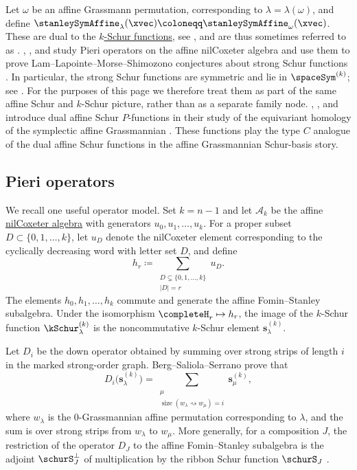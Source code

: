Let $\omega$ be an affine Grassmann permutation, corresponding to
$\lambda = \lambda(\omega)$, and define
$\stanleySymAffine_\lambda(\xvec) \coloneqq \stanleySymAffine_\omega(\xvec)$.
These are dual to the \hyperref[kSchur]{$k$-Schur functions}, see \cite{MorseSchilling2015,LapointeMorse2008},
and are thus sometimes referred to as
\label{dualKSchurFunction}.
, , and  study
Pieri operators on the affine nilCoxeter algebra and use them to prove
Lam--Lapointe--Morse--Shimozono conjectures about strong Schur functions
\cite{BergSaliolaSerrano2013}.  In particular, the strong Schur functions
are symmetric and lie in $\spaceSym^{(k)}$; see
\cite[Thms.~5.2 and 5.4]{BergSaliolaSerrano2013}.  For the purposes of this
page we therefore treat them as part of the same affine Schur and
$k$-Schur picture, rather than as a separate family node.
, , and 
introduce dual affine Schur $P$-functions in their study of the equivariant
homology of the symplectic affine Grassmannian \cite{IkedaIwaoShimozono2025x}.
These functions play the type $C$ analogue of the dual affine Schur functions
in the affine Grassmannian Schur-basis story.

\subsection[schurAffinePieriOperators]{Pieri operators}

We recall one useful operator model.  Set $k=n-1$ and let $\mathcal{A}_k$
be the affine \hyperref[nilCoxeterAlgebra]{nilCoxeter algebra} with
generators $u_0,u_1,\dotsc,u_k$.
For a proper subset $D\subset \{0,1,\dotsc,k\}$, let $u_D$ denote the
nilCoxeter element corresponding to the cyclically decreasing word with
letter set $D$, and define
\[
h_r \coloneqq
  \sum_{\substack{D\subsetneq \{0,1,\dotsc,k\}\\ |D|=r}} u_D.
\]
The elements $h_0,h_1,\dotsc,h_k$ commute and generate the affine
Fomin--Stanley subalgebra.  Under the isomorphism
$\completeH_r\mapsto h_r$, the image of the $k$-Schur function
$\kSchur^{(k)}_\lambda$ is the noncommutative $k$-Schur element
$\mathbf{s}^{(k)}_\lambda$.

Let $D_i$ be the down operator obtained by summing over strong strips of
length $i$ in the marked strong-order graph.  Berg--Saliola--Serrano prove
\cite[Thm.~4.7]{BergSaliolaSerrano2013} that
\[
D_i\bigl(\mathbf{s}^{(k)}_\lambda\bigr)
  = \sum_{\substack{\mu\\ \operatorname{size}(w_\lambda \rightsquigarrow w_\mu)=i}}
      \mathbf{s}^{(k)}_\mu,
\]
where $w_\lambda$ is the $0$-Grassmannian affine permutation corresponding
to $\lambda$, and the sum is over strong strips from $w_\lambda$ to
$w_\mu$.  More generally, for a composition $J$, the restriction of the
operator $D_J$ to the affine Fomin--Stanley subalgebra is the adjoint
$\schurS_J^\perp$ of multiplication by the ribbon Schur function
$\schurS_J$ \cite[Thm.~4.9]{BergSaliolaSerrano2013}.

